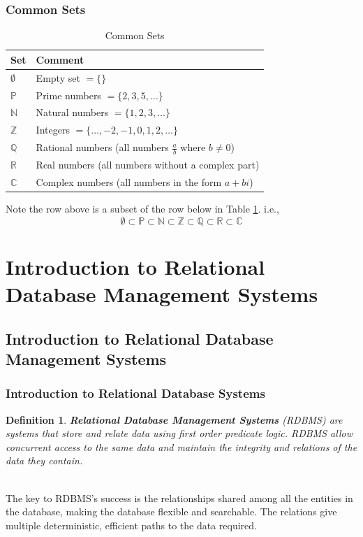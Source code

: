 \documentclass[aspectratio=169]{beamer}
\newtheorem{defn}{Definition}
\begin{document}
\begin{frame}
\frametitle{Common Sets}
\begin{table}
\begin{tabular}{|l|l|}
\hline
\textbf{Set} & \textbf{Comment}\\
\hline
$\emptyset$ & Empty set $ = \{\}$\\
\hline
$\mathbb{P}$ & Prime numbers $ = \{2, 3, 5, \dots\}$\\
\hline
$\mathbb{N}$ & Natural numbers $ = \{1, 2, 3, \dots \}$\\
\hline
$\mathbb{Z}$ & Integers $ = \{\dots, -2, -1, 0, 1, 2, \dots\}$\\
\hline
$\mathbb{Q}$ & Rational numbers (all numbers $\frac ab$ where $b \ne 0$)\\
\hline
$\mathbb{R}$ & Real numbers (all numbers without a complex part)\\
\hline
$\mathbb{C}$ & Complex numbers (all numbers in the form $a + bi$)\\
\hline
\end{tabular}
\caption{Common Sets}
\label{tbl:commonsets}
\end{table}
Note the row above is a subset of the row below in Table \ref{tbl:commonsets}. i.e.,
\[
\emptyset \subset \mathbb{P} \subset \mathbb{N} \subset \mathbb{Z} \subset \mathbb{Q} \subset \mathbb{R} \subset \mathbb{C}
\]
\end{frame}

\section{Introduction to Relational Database Management Systems}
\subsection{Introduction to Relational Database Management Systems}
\begin{frame}
\frametitle{Introduction to Relational Database Systems}
\begin{defn}
\textbf{Relational Database Management Systems} (RDBMS) are systems that store and relate data using first order predicate logic. RDBMS allow concurrent access to the same data and maintain the integrity and relations of the data they contain.
\end{defn}

\pause
\mbox{}\\
The key to RDBMS's success is the relationships shared among all the entities in the database, making the database flexible and searchable. The relations give multiple deterministic, efficient paths to the data required.
\end{frame}
\end{document}
